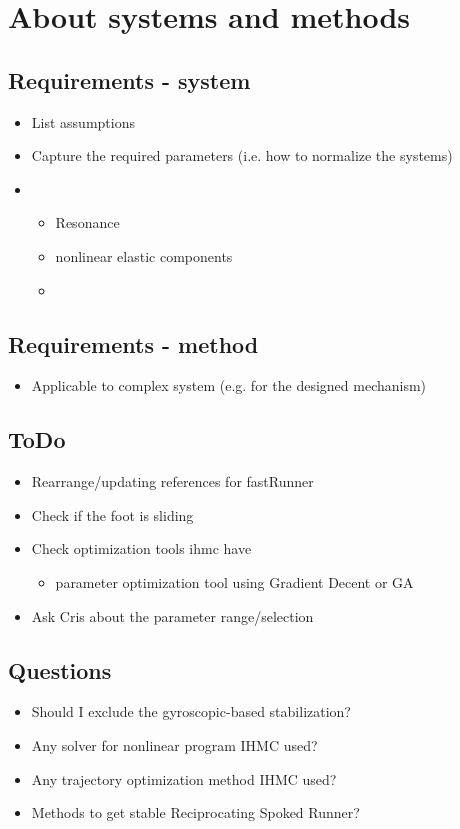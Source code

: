 \section{About systems and methods}
\subsection{Requirements - system}
\begin{itemize}
\item List assumptions
\item Capture the required parameters (i.e. how to normalize the systems)
\item 
	\begin{itemize}
	\item Resonance
	\item nonlinear elastic components
	\item
	\end{itemize}
\end{itemize}
\subsection{Requirements - method}
\begin{itemize}
\item Applicable to complex system (e.g. for the designed mechanism)
\end{itemize}

\subsection{ToDo}
\begin{itemize}
\item Rearrange/updating references for fastRunner
\item Check if the foot is sliding
\item Check optimization tools ihmc have
\begin{itemize}
\item parameter optimization tool using Gradient Decent or GA
\end{itemize}
\item Ask Cris about the parameter range/selection
\end{itemize}

\subsection{Questions}
\begin{itemize}
\item Should I exclude the gyroscopic-based stabilization? 
\item Any solver for nonlinear program IHMC used?
\item Any trajectory optimization method IHMC used?
\item Methods to get stable Reciprocating Spoked Runner?
\end{itemize}

\pagebreak